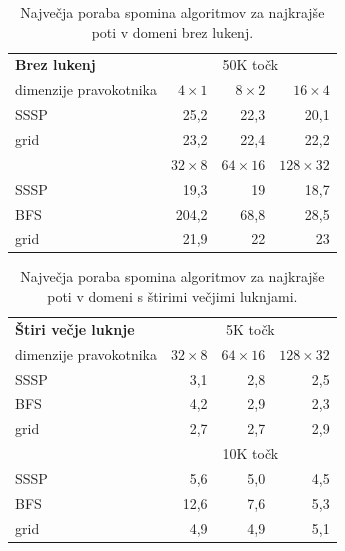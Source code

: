 \documentclass[a4paper, 12pt]{book}
\begin{document}
\begin{table}[htp]
\begin{center}
\begin{tabular}{l*{3}{r}}
\textbf{Brez lukenj} & \multicolumn{3}{c}{50K točk}\\						
dimenzije pravokotnika	&	$4\times 1$	&	$8\times 2$	&	$16\times 4$ \\
\hline
SSSP	&	25,2	&	22,3	&	20,1		\\
grid	&	23,2	&	22,4	&	22,2	\vspace{.2cm}	\\

&	$32\times 8$	&	$64\times 16$	&	$128\times 32$	\\
\hline
SSSP &	19,3	&	19	&	18,7 \\
BFS &	204,2	&	68,8	&	28,5 \\
grid &	21,9	&	22	&	23 \vspace{.2cm} \\
\end{tabular}
\caption{Največja poraba spomina algoritmov za najkrajše poti v domeni brez lukenj.}
\label{table-ram-tree-1}
\end{center}
\end{table}

\begin{table}[htp]
\begin{center}
\begin{tabular}{l*{3}{r}}
\textbf{Štiri večje luknje} & \multicolumn{3}{c}{5K točk}\\						
dimenzije pravokotnika	&	$32\times 8$	&	$64\times 16$	&	$128\times 32$	\\
\hline
SSSP	&	3,1	&	2,8	&	2,5		\\
BFS &	4,2	&	2,9	&	2,3 \\
grid	&	2,7	&	2,7	&	2,9	\vspace{.2cm}	\\
\hline
& \multicolumn{3}{c}{10K točk} \\
\hline
SSSP	&	5,6	 &	5,0	&	4,5		\\
BFS &	12,6	&	7,6	&	5,3 \\
grid	&	4,9	&	4,9	&	5,1	\vspace{.2cm}	\\
\end{tabular}
\caption{Največja poraba spomina algoritmov za najkrajše poti v domeni s štirimi večjimi luknjami.}
\label{table-ram-tree-2}
\end{center}
\end{table}
\end{document}
